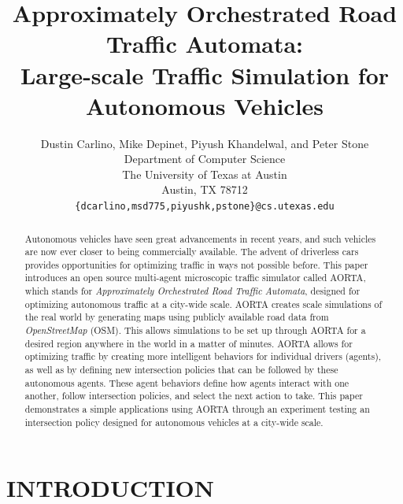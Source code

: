 \documentclass[letterpaper, 10 pt, conference]{ieeeconf}  %
\title{\LARGE \bf
Approximately Orchestrated Road Traffic Automata:\\
Large-scale Traffic Simulation for Autonomous Vehicles
}
\author{Dustin Carlino, Mike Depinet, Piyush Khandelwal, and Peter Stone\\
        Department of Computer Science\\
        The University of Texas at Austin\\
        Austin, TX 78712\\
        {\tt \small\{dcarlino,msd775,piyushk,pstone\}@cs.utexas.edu}}
\begin{document}
\maketitle
\thispagestyle{empty}
\pagestyle{empty}


\begin{abstract} 

Autonomous vehicles have seen great advancements in recent years, and such
vehicles are now ever closer to being commercially available.  The advent of
driverless cars provides opportunities for optimizing traffic in ways not
possible before. This paper introduces an open source multi-agent microscopic
traffic simulator called AORTA, which stands for \textit{Approximately
Orchestrated Road Traffic Automata}, designed for optimizing autonomous traffic
at a city-wide scale. AORTA creates scale simulations of the real world by
generating maps using publicly available road data from \textit{OpenStreetMap}
(OSM). This allows simulations to be set up through AORTA for a desired region
anywhere in the world in a matter of minutes. AORTA allows for optimizing
traffic by creating more intelligent behaviors for individual drivers (agents),
as well as by defining new intersection policies that can be followed by these
autonomous agents. These agent behaviors define how agents interact with one
another, follow intersection policies, and select the next action to take. This
paper demonstrates a simple applications using AORTA through an experiment
testing an intersection policy designed for autonomous vehicles at a city-wide
scale.

\end{abstract}


\section{INTRODUCTION}
\label{sec:introduction}

\end{document}
